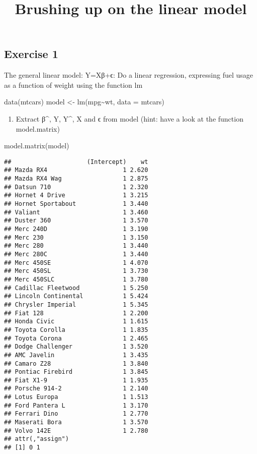 \documentclass[
]{article}
\title{Brushing up on the linear model}
\author{}
\date{\vspace{-2.5em}}
\newenvironment{Shaded}{\begin{snugshade}}{\end{snugshade}}
\newcommand{\AttributeTok}[1]{\textcolor[rgb]{0.77,0.63,0.00}{#1}}
\newcommand{\FunctionTok}[1]{\textcolor[rgb]{0.00,0.00,0.00}{#1}}
\newcommand{\NormalTok}[1]{#1}
\newcommand{\OtherTok}[1]{\textcolor[rgb]{0.56,0.35,0.01}{#1}}
\newcommand{\SpecialCharTok}[1]{\textcolor[rgb]{0.00,0.00,0.00}{#1}}
\providecommand{\tightlist}{%
  \setlength{\itemsep}{0pt}\setlength{\parskip}{0pt}}
\begin{document}
\maketitle

\hypertarget{exercise-1}{%
\subsection{Exercise 1}\label{exercise-1}}

The general linear model: Y=Xβ+ϵ: Do a linear regression, expressing
fuel usage as a function of weight using the function lm

\begin{Shaded}
\begin{Highlighting}[]
\FunctionTok{data}\NormalTok{(mtcars)}
\NormalTok{model }\OtherTok{\textless{}{-}} \FunctionTok{lm}\NormalTok{(mpg}\SpecialCharTok{\textasciitilde{}}\NormalTok{wt, }\AttributeTok{data =}\NormalTok{ mtcars)}
\end{Highlighting}
\end{Shaded}

\begin{enumerate}
\def\labelenumi{\arabic{enumi}.}
\tightlist
\item
  Extract β\^{}, Y, Y\^{}, X and ϵ from model (hint: have a look at the
  function model.matrix)
\end{enumerate}

\begin{Shaded}
\begin{Highlighting}[]
\FunctionTok{model.matrix}\NormalTok{(model)}
\end{Highlighting}
\end{Shaded}

\begin{verbatim}
##                     (Intercept)    wt
## Mazda RX4                     1 2.620
## Mazda RX4 Wag                 1 2.875
## Datsun 710                    1 2.320
## Hornet 4 Drive                1 3.215
## Hornet Sportabout             1 3.440
## Valiant                       1 3.460
## Duster 360                    1 3.570
## Merc 240D                     1 3.190
## Merc 230                      1 3.150
## Merc 280                      1 3.440
## Merc 280C                     1 3.440
## Merc 450SE                    1 4.070
## Merc 450SL                    1 3.730
## Merc 450SLC                   1 3.780
## Cadillac Fleetwood            1 5.250
## Lincoln Continental           1 5.424
## Chrysler Imperial             1 5.345
## Fiat 128                      1 2.200
## Honda Civic                   1 1.615
## Toyota Corolla                1 1.835
## Toyota Corona                 1 2.465
## Dodge Challenger              1 3.520
## AMC Javelin                   1 3.435
## Camaro Z28                    1 3.840
## Pontiac Firebird              1 3.845
## Fiat X1-9                     1 1.935
## Porsche 914-2                 1 2.140
## Lotus Europa                  1 1.513
## Ford Pantera L                1 3.170
## Ferrari Dino                  1 2.770
## Maserati Bora                 1 3.570
## Volvo 142E                    1 2.780
## attr(,"assign")
## [1] 0 1
\end{verbatim}
\end{document}

